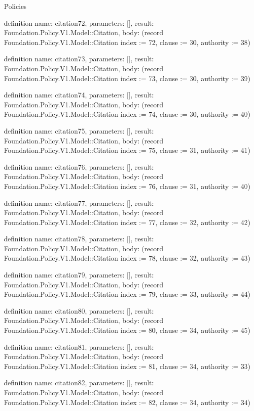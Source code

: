 \begin{lexlean}{Policies}
\begin{semanticmodule}
definition{
  name: citation72,
  parameters: [],
  result: Foundation.Policy.V1.Model::Citation,
  body: (record Foundation.Policy.V1.Model::Citation {index := 72, clause := 30, authority := 38})
}

definition{
  name: citation73,
  parameters: [],
  result: Foundation.Policy.V1.Model::Citation,
  body: (record Foundation.Policy.V1.Model::Citation {index := 73, clause := 30, authority := 39})
}

definition{
  name: citation74,
  parameters: [],
  result: Foundation.Policy.V1.Model::Citation,
  body: (record Foundation.Policy.V1.Model::Citation {index := 74, clause := 30, authority := 40})
}

definition{
  name: citation75,
  parameters: [],
  result: Foundation.Policy.V1.Model::Citation,
  body: (record Foundation.Policy.V1.Model::Citation {index := 75, clause := 31, authority := 41})
}

definition{
  name: citation76,
  parameters: [],
  result: Foundation.Policy.V1.Model::Citation,
  body: (record Foundation.Policy.V1.Model::Citation {index := 76, clause := 31, authority := 40})
}

definition{
  name: citation77,
  parameters: [],
  result: Foundation.Policy.V1.Model::Citation,
  body: (record Foundation.Policy.V1.Model::Citation {index := 77, clause := 32, authority := 42})
}

definition{
  name: citation78,
  parameters: [],
  result: Foundation.Policy.V1.Model::Citation,
  body: (record Foundation.Policy.V1.Model::Citation {index := 78, clause := 32, authority := 43})
}

definition{
  name: citation79,
  parameters: [],
  result: Foundation.Policy.V1.Model::Citation,
  body: (record Foundation.Policy.V1.Model::Citation {index := 79, clause := 33, authority := 44})
}

definition{
  name: citation80,
  parameters: [],
  result: Foundation.Policy.V1.Model::Citation,
  body: (record Foundation.Policy.V1.Model::Citation {index := 80, clause := 34, authority := 45})
}

definition{
  name: citation81,
  parameters: [],
  result: Foundation.Policy.V1.Model::Citation,
  body: (record Foundation.Policy.V1.Model::Citation {index := 81, clause := 34, authority := 33})
}

definition{
  name: citation82,
  parameters: [],
  result: Foundation.Policy.V1.Model::Citation,
  body: (record Foundation.Policy.V1.Model::Citation {index := 82, clause := 34, authority := 34})
}


\end{semanticmodule}
\end{lexlean}
